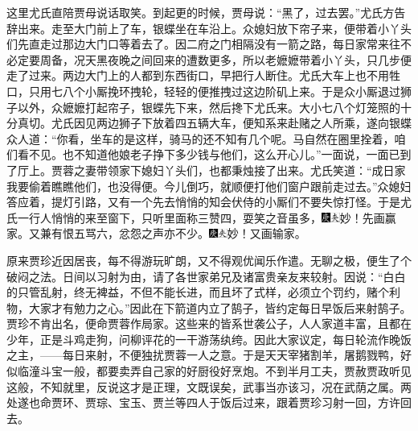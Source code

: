 这里尤氏直陪贾母说话取笑。到起更的时候，贾母说：``黑了，过去罢。''尤氏方告辞出来。走至大门前上了车，银蝶坐在车沿上。众媳妇放下帘子来，便带着小丫头们先直走过那边大门口等着去了。因二府之门相隔没有一箭之路，每日家常来往不必定要周备，况天黑夜晚之间回来的遭数更多，所以老嬷嬷带着小丫头，只几步便走了过来。两边大门上的人都到东西街口，早把行人断住。尤氏大车上也不用牲口，只用七八个小厮挽环拽轮，轻轻的便推拽过这边阶矶上来。于是众小厮退过狮子以外，众嬷嬷打起帘子，银蝶先下来，然后搀下尤氏来。大小七八个灯笼照的十分真切。尤氏因见两边狮子下放着四五辆大车，便知系来赴赌之人所乘，遂向银蝶众人道：``你看，坐车的是这样，骑马的还不知有几个呢。马自然在圈里拴着，咱们看不见。也不知道他娘老子挣下多少钱与他们，这么开心儿。''一面说，一面已到了厅上。贾蓉之妻带领家下媳妇丫头们，也都秉烛接了出来。尤氏笑道：``成日家我要偷着瞧瞧他们，也没得便。今儿倒巧，就顺便打他们窗户跟前走过去。''众媳妇答应着，提灯引路，又有一个先去悄悄的知会伏侍的小厮们不要失惊打怪。于是尤氏一行人悄悄的来至窗下，只听里面称三赞四，耍笑之音虽多，{\includegraphics[width=3mm]{../Images/00004}\includegraphics[width=3mm]{../Images/00012}\footnotesize \kaishu 妙！先画赢家。}又兼有恨五骂六，忿怨之声亦不少。{\includegraphics[width=3mm]{../Images/00004}\includegraphics[width=3mm]{../Images/00012}\footnotesize \kaishu 妙！又画输家。}

原来贾珍近因居丧，每不得游玩旷朗，又不得观优闻乐作遣。无聊之极，便生了个破闷之法。日间以习射为由，请了各世家弟兄及诸富贵亲友来较射。因说：``白白的只管乱射，终无裨益，不但不能长进，而且坏了式样，必须立个罚约，赌个利物，大家才有勉力之心。''因此在下箭道内立了鹄子，皆约定每日早饭后来射鹄子。贾珍不肯出名，便命贾蓉作局家。这些来的皆系世袭公子，人人家道丰富，且都在少年，正是斗鸡走狗，问柳评花的一干游荡纨绔。因此大家议定，每日轮流作晚饭之主，------每日来射，不便独扰贾蓉一人之意。于是天天宰猪割羊，屠鹅戮鸭，好似临潼斗宝一般，都要卖弄自己家的好厨役好烹炮。不到半月工夫，贾赦贾政听见这般，不知就里，反说这才是正理，文既误矣，武事当亦该习，况在武荫之属。两处遂也命贾环、贾琮、宝玉、贾兰等四人于饭后过来，跟着贾珍习射一回，方许回去。

